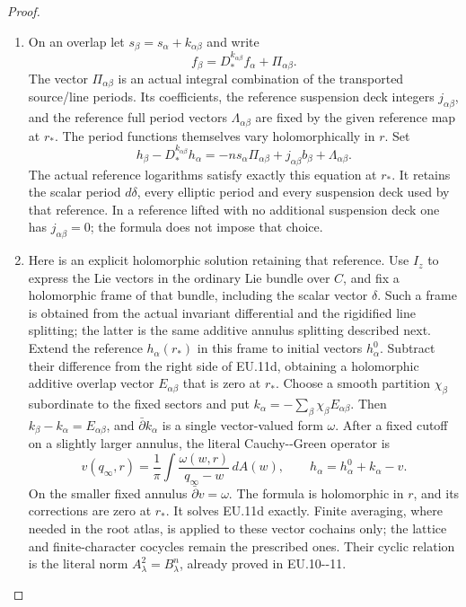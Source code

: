 \begin{proof}
\begin{enumerate}[label=\arabic*.]
\item On an overlap let \(s_\beta=s_\alpha+k_{\alpha\beta}\) and write
\[
 f_\beta=D_*^{k_{\alpha\beta}}f_\alpha+
                         \Pi_{\alpha\beta}.
\]
The vector \(\Pi_{\alpha\beta}\) is an actual integral combination
of the transported source/line periods. Its coefficients, the
reference suspension deck integers \(j_{\alpha\beta}\), and the
reference full period vectors \(\Lambda_{\alpha\beta}\) are fixed
by the given reference map at \(r_*\). The period functions themselves
vary holomorphically in \(r\). Set
\[
 h_\beta-D_*^{k_{\alpha\beta}}h_\alpha
  =-n s_\alpha\Pi_{\alpha\beta}
          +j_{\alpha\beta}b_\beta+\Lambda_{\alpha\beta}.
 \tag{EU.11d}
\]
The actual reference logarithms satisfy exactly this equation at
\(r_*\). It retains the scalar period \(d\delta\), every elliptic
period and every suspension deck used by that reference. In a
reference lifted with no additional suspension deck one has
\(j_{\alpha\beta}=0\); the formula does not impose that choice.

\item Here is an explicit holomorphic solution retaining that reference.
Use \(I_z\) to express the Lie vectors in the ordinary Lie bundle
over \(C\), and fix a holomorphic frame of that bundle, including
the scalar vector \(\delta\). Such a frame is obtained from the
actual invariant differential and the rigidified line splitting;
the latter is the same additive annulus splitting described next.
Extend the reference \(h_\alpha(r_*)\) in this frame to initial
vectors \(h^0_\alpha\). Subtract their difference from the right
side of EU.11d, obtaining a holomorphic additive overlap vector
\(E_{\alpha\beta}\) that is zero at \(r_*\).
Choose a smooth partition \(\chi_\beta\) subordinate to the fixed
sectors and put \(k_\alpha=-\sum_\beta\chi_\beta
E_{\alpha\beta}\). Then \(k_\beta-k_\alpha=E_{\alpha\beta}\),
and \(\bar\partial k_\alpha\) is a single vector-valued form
\(\omega\). After a fixed cutoff on a slightly larger annulus,
the literal Cauchy-\/-Green operator is
\[
 v(q_\infty,r)=\frac1\pi\int
            \frac{\omega(w,r)}{q_\infty-w}\,dA(w),\qquad
 h_\alpha=h^0_\alpha+k_\alpha-v.
 \tag{EU.11e}
\]
On the smaller fixed annulus \(\bar\partial v=\omega\).
The formula is holomorphic in \(r\), and its corrections are zero
at \(r_*\). It solves EU.11d exactly. Finite averaging, where
needed in the root atlas, is applied to these vector cochains only;
the lattice and finite-character cocycles remain the prescribed
ones. Their cyclic relation is the literal norm
\(A_\lambda^2=B_\lambda^n\), already proved in EU.10-\/-11.


\end{enumerate}
\end{proof}
